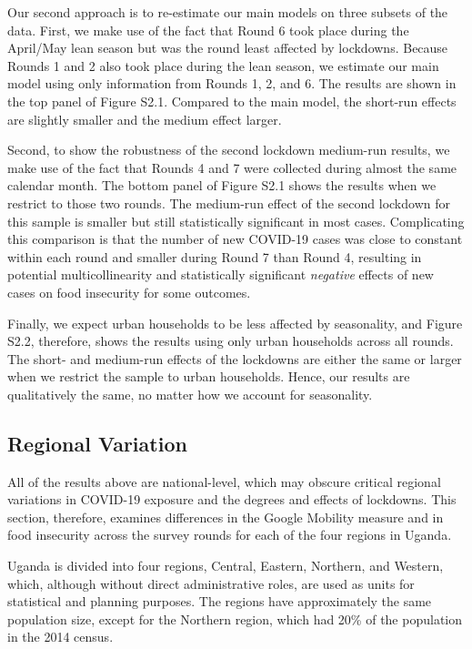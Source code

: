 \documentclass{wber}
\begin{document}
Our second approach is to re-estimate our main models on three subsets
of the data. First, we make use of the fact that Round 6 took place
during the April/May lean season but was the round least affected by
lockdowns. Because Rounds 1 and 2 also took place during the lean
season, we estimate our main model using only information from Rounds 1,
2, and 6. The results are shown in the top panel of Figure S2.1. 
Compared to the main model, the short-run effects are slightly smaller 
and the medium effect larger.

Second, to show the robustness of the second lockdown medium-run
results, we make use of the fact that Rounds 4 and 7 were collected
during almost the same calendar month. The bottom panel of 
Figure S2.1 shows the results when we restrict
to those two rounds. The medium-run effect of the second lockdown for
this sample is smaller but still statistically significant in most
cases. Complicating this comparison is that the number of new COVID-19
cases was close to constant within each round and smaller during Round 7
than Round 4, resulting in potential multicollinearity and statistically
significant \emph{negative} effects of new cases on food insecurity for
some outcomes.

Finally, we expect urban households to be less affected by seasonality,
and Figure S2.2, therefore, shows the
results using only urban households across all rounds. The short- and
medium-run effects of the lockdowns are either the same or larger when
we restrict the sample to urban households. Hence, our results are
qualitatively the same, no matter how we account for seasonality.

\subsection{Regional Variation}\label{regional-variation}

All of the results above are national-level, which may obscure critical
regional variations in COVID-19 exposure and the degrees and effects of
lockdowns. This section, therefore, examines differences in the Google
Mobility measure and in food insecurity across the survey rounds for
each of the four regions in Uganda.

Uganda is divided into four regions, Central, Eastern, Northern, and
Western, which, although without direct administrative roles, are used
as units for statistical and planning purposes. The regions have
approximately the same population size, except for the Northern region,
which had 20\% of the population in the 2014 census.
\end{document}
